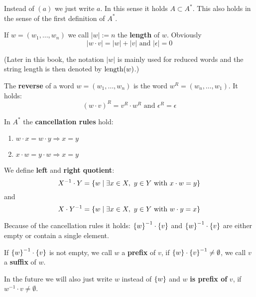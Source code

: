 Instead of $(a)$ we just write $a$. In this sense it holds $A \subset A^*$. This
also holds in the sense of the first definition of $A^*$.

If $w = (w_1, \ldots, w_n)$ we call $|w| := n$ the {\bf length} of $w$.
Obviously \[|w \cdot v| = |w| + |v|\text{ and }|\epsilon| = 0\]

(Later in this book, the notation $|w|$ is mainly used for reduced words and
the string length is then denoted by $\mathrm{length}({w})$.)

The {\bf reverse} of a word $w = (w_1,\ldots,w_n)$ is the word $w^R =
(w_n,\ldots,w_1)$. It holds:
\[ (w \cdot v)^R = v^R \cdot w^R \text{ and }\epsilon^R = \epsilon \]

In $A^*$ the {\bf cancellation rules} hold:
\begin{enumerate}
  \item $w \cdot x = w \cdot y \Rightarrow x = y$
  \item $x \cdot w = y \cdot w \Rightarrow x = y$
\end{enumerate}

We define {\bf left} and {\bf right quotient}:
\[ X^{-1} \cdot Y = \mbox{$\{w \mid \exists x \in X,\ y \in Y\text{ with }x \cdot w
= y \}$} \] 
and 
\[ X \cdot Y^{-1} = \mbox{$\{w \mid \exists x \in X,\ y \in Y\text{ with } w \cdot y
= x \}$} \]

Because of the cancellation rules it holds: $\mbox{$\{w\}$}^{-1} \cdot \mbox{$\{v\}$}$ and
$\mbox{$\{w\}$}^{-1} \cdot \mbox{$\{v\}$}$ are either empty or contain a single element.

If $\mbox{$\{w\}$}^{-1} \cdot \mbox{$\{v\}$}$ is not empty, we call $w$ a {\bf prefix} of $v$,
if $\mbox{$\{w\}$} \cdot \mbox{$\{v \}$}^{-1} \neq \emptyset$, we call $v$ a {\bf suffix}
of $w$.

In the future we will also just write $w$ instead of $\mbox{$\{w\}$}$ and $w$ {\bf is
prefix of} $v$, if $w^{-1} \cdot v \neq \emptyset$.
